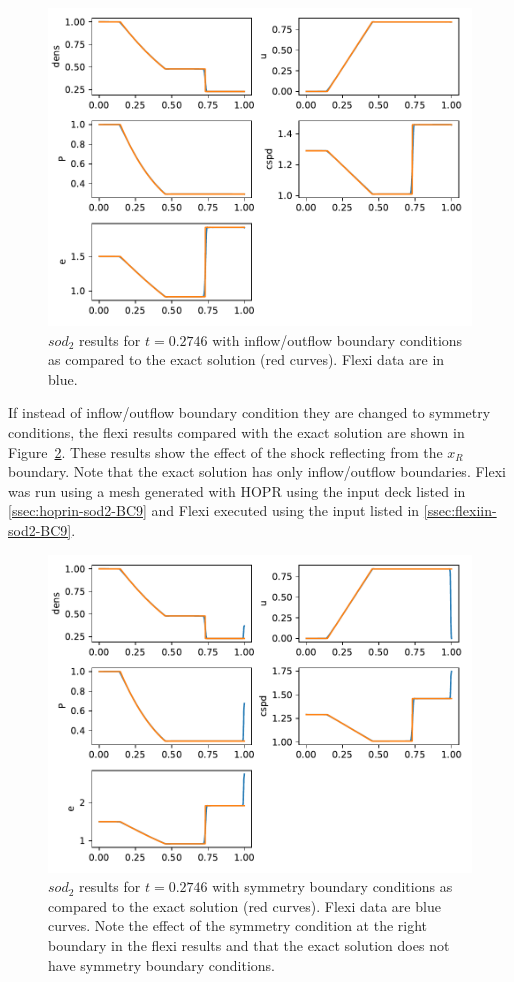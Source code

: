 \begin{figure}[h!]
 \centering
 \includegraphics[scale=0.8]{figures/sod2-BC2-PV.pdf}
 \caption{$sod_2$ results for $t = 0.2746$ with inflow/outflow boundary conditions as compared to the exact solution (red curves). Flexi data are in blue.}
 \label{fig:Sod2-BC2}
\end{figure}

If instead of inflow/outflow boundary condition they are changed to symmetry conditions, the flexi results compared with the exact solution are shown in Figure~\ref{fig:Sod2-BC9}.  These results show the effect of the shock reflecting from the $x_R$ boundary. Note that the exact solution has only inflow/outflow boundaries. Flexi was run using a mesh generated with HOPR using the input deck listed in \ref{ssec:hoprin-sod2-BC9} and Flexi executed using the input listed in \ref{ssec:flexiin-sod2-BC9}.

\begin{figure}[h!]
 \centering
 \includegraphics[scale=0.8]{figures/sod2-BC9-PV.pdf}
 \caption{$sod_2$ results for $t = 0.2746$ with symmetry boundary conditions as compared to the exact solution (red curves). Flexi data are blue curves. Note the effect of the symmetry condition at the right boundary in the flexi results and that the exact solution does not have symmetry boundary conditions.}
 \label{fig:Sod2-BC9}
\end{figure}

